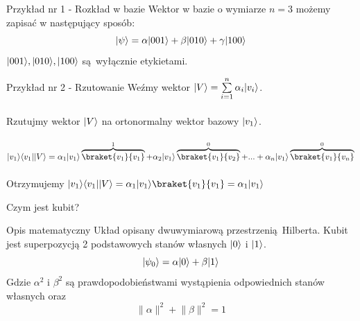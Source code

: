 \documentclass{beamer}
\DeclarePairedDelimiter\bra{\langle}{\rvert}
\DeclarePairedDelimiter\ket{\lvert}{\rangle}
\begin{document}
	\begin{frame}
		\begin{block}{Przykład nr 1 - Rozkład w bazie}
			\vspace{0.5em}
			Wektor w bazie o wymiarze $n=3$ możemy zapisać w następujący sposób:
				\begin{equation*}
					\ket{\psi} = \alpha\ket{001} + \beta\ket{010} + \gamma\ket{100}
				\end{equation*}
			$\ket{001},\ket{010},\ket{100}$ są wyłącznie etykietami.
			
			\vspace{0.5em}
		\end{block}
	
		\begin{block}{Przykład nr 2 - Rzutowanie}
			\vspace{0.5em}
			Weźmy wektor  $\ket{V} = \sum\limits_{i=1}^n \alpha_{i}\ket{v_{i}}$.\\~\\
			Rzutujmy wektor $\ket{V}$ na ortonormalny wektor bazowy $\ket{v_{1}}$.\\~\\
			$\ket{v_{1}}\bra{v_{1}}\ket{V}=
			\alpha_{1}\ket{v_{1}}\overbrace{\braket{v_{1}}{v_{1}}}^{1} +
			 \alpha_{2}\ket{v_{1}}\overbrace{\braket{v_{1}}{v_{2}}}^{0} +...+
			 \alpha_{n}\ket{v_{1}}\overbrace{\braket{v_{1}}{v_{n}}}^{0} 
			$\\~\\
			Otrzymujemy $\ket{v_{1}}\bra{v_{1}}\ket{V}= \alpha_{1}\ket{v_{1}}\braket{v_{1}}{v_{1}}=\alpha_{1}\ket{v_{1}}$
			
			\vspace{0.5em}
		\end{block}
	\end{frame}
			
	\begin{frame}{Czym jest kubit?}
		
		\begin{block}{Opis matematyczny}
		\vspace{0.5em}
		Układ opisany dwuwymiarową przestrzenią Hilberta. Kubit jest superpozycją 2 podstawowych stanów własnych $\ket{0}$ i $\ket{1}$.\\
		\begin{equation*}
			\ket{\psi_{0}} = \alpha\ket{0} + \beta\ket{1}
		\end{equation*}
		Gdzie $\alpha^{2}$ i $\beta^{2}$ są prawdopodobieństwami wystąpienia odpowiednich stanów własnych oraz $$\lVert\alpha\rVert^{2} + \lVert\beta\rVert^{2} = 1$$
		
		\vspace{0.5em}
		\end{block}			
	\end{frame}
\end{document}
